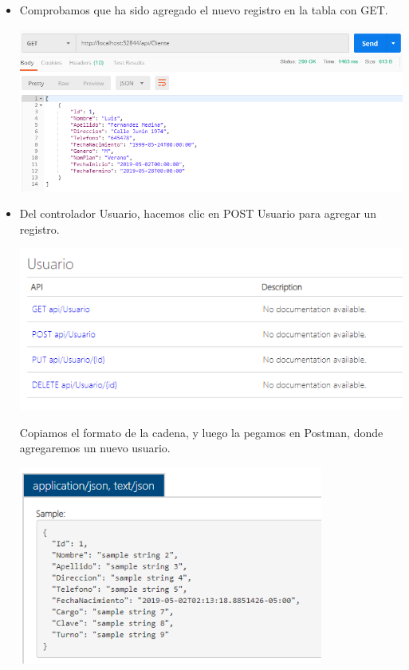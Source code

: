 \begin{itemize}
\begin{center}
             \end{center}
\item Comprobamos que ha sido agregado el nuevo registro en la tabla con GET.
 \begin{center}
			\includegraphics[width=15cm]{./Imagenes/gcl}
             \end{center}
\item Del controlador Usuario, hacemos clic en POST Usuario para agregar un registro.
 \begin{center}
			\includegraphics[width=14cm]{./Imagenes/us}
             \end{center}
Copiamos el formato de la cadena, y luego la pegamos en Postman, donde agregaremos un nuevo usuario.
 \begin{center}
			\includegraphics[width=10cm]{./Imagenes/pusu}

\end{center}
\end{itemize}
